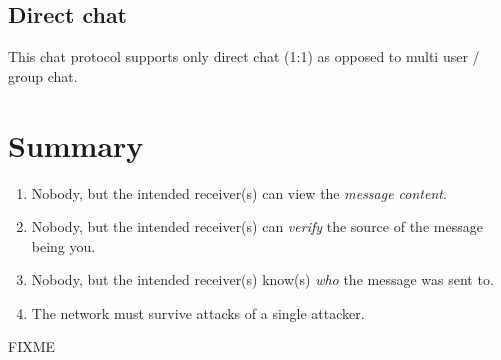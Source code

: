 \subsection{Direct chat}
This chat protocol supports only direct chat (1:1) as opposed 
to multi user / group chat.
\section{Summary}
\begin{enumerate}
\item Nobody, but the intended receiver(s) can view the \emph{message content}.
\item Nobody, but the intended receiver(s) can \emph{verify} the source of the message being you.
\item Nobody, but the intended receiver(s) know(s) \emph{who} the message was sent to.
\item The network must survive attacks of a single attacker.
\end{enumerate}
FIXME 
